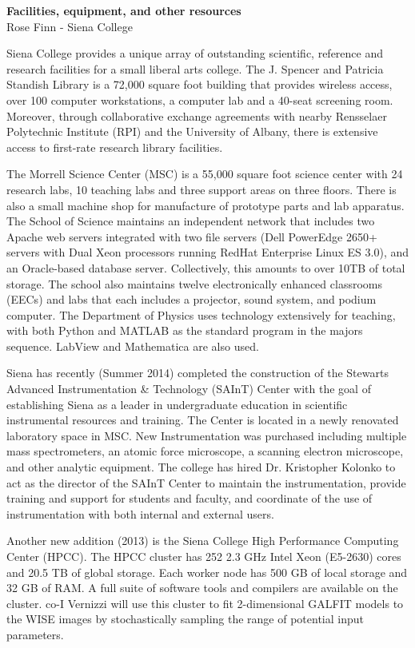 \documentclass[11pt,preprint]{aastex}
\begin{document}

\noindent
{\Large\bf Facilities, equipment, and other resources}\\
{\Large Rose Finn - Siena College}


Siena College provides a unique array of outstanding scientific, reference and research facilities 
for a small liberal arts college.  The J. Spencer and Patricia Standish Library is a 72,000 square foot 
building that provides wireless access, over 100 computer workstations, a computer lab and a 40-seat 
screening room.  Moreover, through collaborative exchange agreements with nearby Rensselaer Polytechnic Institute (RPI) 
and the University of Albany, there is extensive access to first-rate research library facilities.

The Morrell Science Center (MSC) is a 55,000 square foot science center with 24 research labs, 10 teaching labs and 
three support areas on three floors. There is also a small machine shop for manufacture of prototype parts and 
lab apparatus.  The School of Science maintains an independent network that includes two Apache web servers integrated 
with two file servers (Dell PowerEdge 2650+ servers with Dual Xeon processors running RedHat Enterprise Linux ES 3.0), 
and an Oracle-based database server.  Collectively, this amounts to over 10TB of total storage. The school also maintains 
twelve electronically enhanced classrooms (EECs) and labs that each includes a projector, sound system, and podium computer. 
The Department of Physics uses technology extensively for teaching, with both Python and MATLAB as the standard program in the 
majors sequence.  LabView and Mathematica are also used. 

Siena has recently (Summer 2014) completed the construction of the 
Stewarts Advanced Instrumentation \& Technology (SAInT) Center with the goal of 
establishing Siena as a leader in undergraduate education in scientific 
instrumental resources and training. The Center is located in a newly renovated 
laboratory space in MSC. New Instrumentation was 
purchased including multiple mass spectrometers, 
an atomic force microscope, a scanning electron microscope, and other
analytic equipment.
The college has hired Dr. Kristopher Kolonko to act as the director of the SAInT Center to 
maintain the instrumentation, provide training and support for students and faculty, and 
coordinate of the use of instrumentation with both internal and external users.

Another new addition (2013) is the Siena College High Performance Computing Center (HPCC). 
The HPCC cluster has 252 2.3 GHz Intel Xeon (E5-2630) 
cores and 20.5 TB of global storage.  Each worker node has 500 GB of local storage and 32 GB of 
RAM. A full suite of software tools and compilers are available on the
cluster.  co-I Vernizzi will use this cluster
to fit 2-dimensional GALFIT models to the WISE images by
stochastically sampling the range of potential input parameters.
\end{document}
